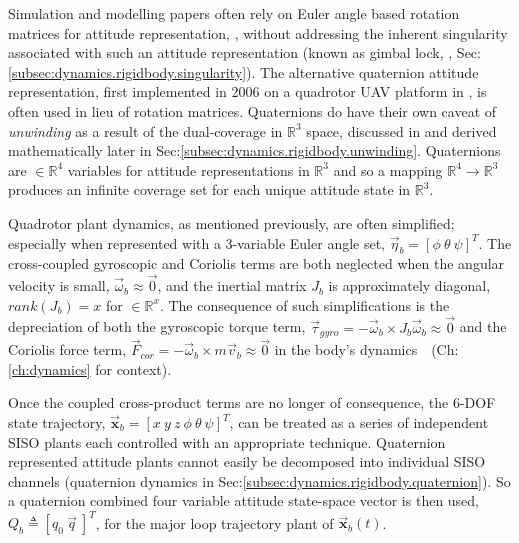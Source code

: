 \par
Simulation and modelling papers often rely on Euler angle based rotation matrices for attitude representation, \cite{adaptivedisturbancecontrol, optimizedpidquadcopter, singleaxistilting, backsteppingquadcoptercontrol, fullquadcoptercontrol}, without addressing the inherent singularity associated with such an attitude representation (known as gimbal lock, \cite{euleranglesingularity}, Sec:\ref{subsec:dynamics.rigidbody.singularity}). The alternative quaternion attitude representation, first implemented in 2006 on a quadrotor UAV platform in \cite{attitudestabilization}, is often used in lieu of rotation matrices. Quaternions do have their own caveat of \emph{unwinding} as a result of the dual-coverage in $\mathbb{R}^3$ space, discussed in \cite{unwinding} and derived mathematically later in Sec:\ref{subsec:dynamics.rigidbody.unwinding}. Quaternions are $\in\mathbb{R}^4$ variables for attitude representations in $\mathbb{R}^3$ and so a mapping $\mathbb{R}^4\rightarrow\mathbb{R}^3$ produces an infinite coverage set for each unique attitude state in $\mathbb{R}^3$.
\par
Quadrotor plant dynamics, as mentioned previously, are often simplified; especially when represented with a 3-variable Euler angle set, $\vec{\eta}_b = [\phi ~\theta ~\psi]^T$. The cross-coupled gyroscopic and Coriolis terms are both neglected when the angular velocity is small, $\vec{\omega}_b \approx \vec{0}$, and the inertial matrix $J_b$ is approximately diagonal, $rank(J_b)= x$ for $\in\mathbb{R}^x$. The consequence of such simplifications is the depreciation of both the gyroscopic torque term, $\vec{\tau}_{gyro}=-\vec{\omega}_b \times J_b\vec{\omega}_b \approx \vec{0}$ and the  Coriolis force term, $\vec{F}_{cor}=-\vec{\omega}_b \times m\vec{v}_b \approx \vec{0}$ in the body's dynamics~~(Ch:\ref{ch:dynamics} for context). 
\par
Once the coupled cross-product terms are no longer of consequence, the 6-DOF state trajectory, $\vec{\mathbf{x}}_b=[x ~y ~z ~\phi ~\theta ~\psi]^T$, can be treated as a series of independent SISO plants each controlled with an appropriate technique. Quaternion represented attitude plants cannot easily be decomposed into individual SISO channels (quaternion dynamics in Sec:\ref{subsec:dynamics.rigidbody.quaternion}). So a quaternion combined four variable attitude state-space vector is then used, $Q_b \triangleq [q_0 ~\vec{q}\>]^T$, for the major loop trajectory plant of $\vec{\mathbf{x}}_b(t)$.
\par

